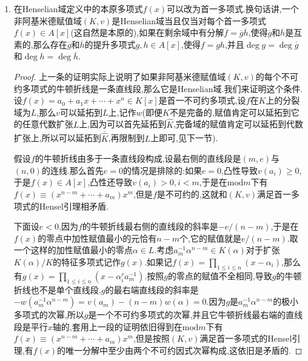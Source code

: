 \begin{enumerate}
\begin{proof}
		\qquad
		
		下面任取本原多项式$f(x)\in A[x]$,做它在$K[x]$上的不可约分解$f(x)=f_1(x)\cdots f_r(x)$.从$1=|f|=\prod|f_i|$,对每个$f_i$适当乘以一个系数,可以使得分解不变$f(x)=\prod_if_i(x)$,但是有每个$|f_i|=1$.于是可设每个$f_i\in A[x]$是本原的不可约多项式.于是要么$\overline{f_i}$是常数,要么它差一个倍数是某个不可约多项式次幂.倘若有$\overline{f}=\overline{g}\overline{h}$分解为互素的两个多项式的乘积,那么那些非常数的$\overline{f_i}$只能恰好在$\overline{g}$和$\overline{h}$中一个的唯一分解中.考虑出现在$\overline{g}$中的那些不是常数的$\overline{f_i}$,把对应的$f_i$乘起来记作$g$,这保证了$\deg g=\deg\overline{g}$,把其余的$\overline{f_i}$(包括那些是常数的)对应的$f_i$乘起来记作$h$,适当对$g,h$调整一个倍数,可以使得$g\equiv\overline{g}$和$h\equiv\overline{h}$,并且有$f=gh$.完成证明.
	\end{proof}
	\item 在Henselian域定义中的本原多项式$f(x)$可以改为首一多项式.换句话讲,一个非阿基米德赋值域$(K,v)$是Henselian域当且仅当对每个首一多项式$f(x)\in A[x]$(这自然是本原的),如果在剩余域中有分解$\overline{f}=\overline{g}\overline{h}$,使得$\overline{g}$和$\overline{h}$是互素的,那么存在$\overline{g}$和$\overline{h}$的提升多项式$g,h\in A[x]$,使得$f=gh$,并且$\deg g=\deg\overline{g}$和$\deg h=\deg\overline{h}$.
	\begin{proof}
		
		上一条的证明实际上说明了如果非阿基米德赋值域$(K,v)$的每个不可约多项式的牛顿折线是一条直线段,那么它是Henselian域.我们来证明这个条件.设$f(x)=a_0+a_1x+\cdots+x^n\in K[x]$是首一不可约多项式,设$f$在$K$上的分裂域为$L$,那么$v$可以延拓到$L$上,记作$w$(即便$K$不是完备的,赋值肯定可以延拓到它的任意代数扩张$L$上,因为可以首先延拓到$\widehat{K}$,完备域的赋值肯定可以延拓到代数扩张上,所以可以延拓到$\overline{\widehat{K}}$,再限制到$L$上即可,见下一节).
		
		\qquad
		
		假设$f$的牛顿折线由多于一条直线段构成,设最右侧的直线段是$(m,e)$与$(n,0)$的连线.那么首先$e=0$的情况是排除的:如果$e=0$,凸性导致$v(a_i)\ge0$,于是$f(x)\in A[x]$,凸性还导致$v(a_i)>0,i<m$,于是在$\mathrm{mod}m$下有$f(x)\equiv(x^{n-m}+\cdots+a_m)x^m$,但是$f$是不可约的,这就和$(K,v)$满足首一多项式的Hensel引理相矛盾.
		
		\qquad
		
		下面设$e<0$,因为$f$的牛顿折线最右侧的直线段的斜率是$-e/(n-m)$,于是在$f(x)$的零点中加性赋值最小的元恰有$n-m$个,它的赋值就是$e/(n-m)$.取一个这样的加性赋值最小的零点$\alpha\in L$.考虑$a_m^{-1}\alpha^{n-m}\in K(\alpha)$对于扩张$K(\alpha)/K$的特征多项式记作$g(x)$.如果记$f(x)=\prod_{1\le i\le n}(x-\alpha_i)$,那么有$g(x)=\prod_{1\le i\le n}(x-\alpha_i^ra_m^{-1})$.按照$g$的零点的赋值不全相同,导致$g$的牛顿折线也不是单个直线段.$g$的最右端直线段的斜率是$-w(a_m^{-1}\alpha^{n-m})=v(a_m)-(n-m)w(\alpha)=0$.因为$g$是$a_m^{-1}\alpha^{n-m}$的极小多项式的次幂,所以$g$是一个不可约多项式的次幂,并且它牛顿折线最右端的直线段是平行$x$轴的,套用上一段的证明依旧得到在$\mathrm{mod}m$下有$f(x)\equiv(x^{n-m}+\cdots+a_m)x^m$,但是按照$(K,v)$满足首一多项式的Hensel引理,有$f(x)$的唯一分解中至少由两个不可约因式次幂构成,这依旧是矛盾的.
	\end{proof}
\end{enumerate}
\newpage

